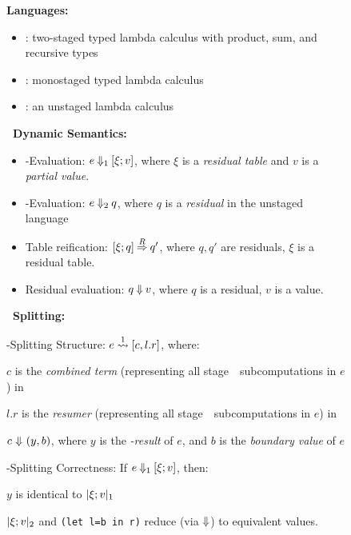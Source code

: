 \begin{figure*}
\textbf{Languages:}
\begin{itemize}
\item \lang: two-staged typed lambda calculus with product, sum, and
  recursive types
\item \langTwo: monostaged typed lambda calculus
\item \langmono: an unstaged lambda calculus
\end{itemize}

\textbf{\lang\ Dynamic Semantics:}
\begin{itemize}
\item 
\bbone-Evaluation: $e\mathbin{{\Downarrow_{ 1}}}[\xi;v]$, where $\xi$ is a \emph{residual table} and $v$ is a \emph{partial value}. 

\item
\bbtwo-Evaluation: $e\mathbin{{\Downarrow_{ 2}}}q$, where $q$ is a \emph{residual} in the unstaged language \langTwo

\item 
Table reification: $[\xi;q]\mathbin{\overset{R}\Rightarrow} q'$, where $q,q'$ are residuals,
$\xi$ is a residual table.

\item
Residual evaluation: $q\mathbin{{\Downarrow}} v$, where $q$ is a residual, $v$ is a
value.
\end{itemize}

\textbf{\lang\ Splitting:}

\hspace{2em}\bbone-Splitting Structure: $e \overset{ 1}\rightsquigarrow [c,l.r]$, where:

\hspace{4em}$c$ is the \emph{combined term}
(representing all stage~\bbone\ subcomputations in $e$)
in \langmono

\hspace{4em}$l.r$ is the \emph{resumer}
(representing all stage~\bbtwo\ subcomputations in $e$)
in \langmono

\hspace{4em}$c~{\Downarrow}~(y,b)$, where 
$y$ is the \emph{\bbone-result} of $e$, and
$b$ is the \emph{boundary value} of $e$

\hspace{2em}\bbone-Splitting Correctness: If $e\mathbin{{\Downarrow_{ 1}}}[\xi;v]$, then:

\hspace{4em}$y$ is identical to $|\xi;v|_{ 1}$

\hspace{4em}$|\xi;v|_{ 2}$ and \texttt{(let l=b in r)} 
reduce (via ${\Downarrow}$) to equivalent values.  


\end{figure*}
